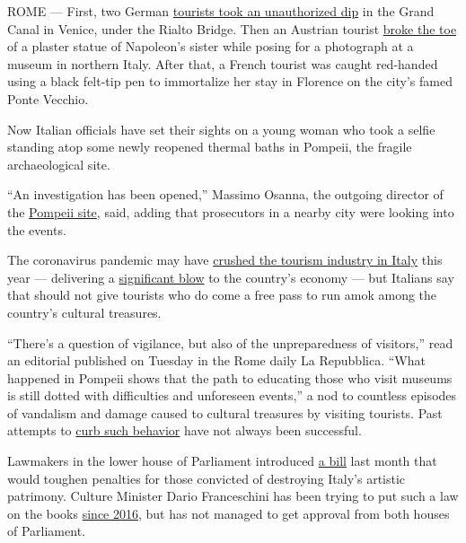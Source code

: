 ROME --- First, two German
\href{https://www.youtube.com/watch?v=dOfUmHXjXqg}{tourists took an
unauthorized dip} in the Grand Canal in Venice, under the Rialto Bridge.
Then an Austrian tourist
\href{https://www.nytimes3xbfgragh.onion/2020/08/06/arts/tourist-breaks-sculptures-toes.html?searchResultPosition=1}{broke
the toe} of a plaster statue of Napoleon's sister while posing for a
photograph at a museum in northern Italy. After that, a French tourist
was caught red-handed using a black felt-tip pen to immortalize her stay
in Florence on the city's famed Ponte Vecchio.

Now Italian officials have set their sights on a young woman who took a
selfie standing atop some newly reopened thermal baths in Pompeii, the
fragile archaeological site.

``An investigation has been opened,'' Massimo Osanna, the outgoing
director of the \href{http://pompeiisites.org/en/}{Pompeii site}, said,
adding that prosecutors in a nearby city were looking into the events.

The coronavirus pandemic may have
\href{https://www.confcommercio.it/-/niente-turisti-stranieri-crolla-lusso}{crushed
the tourism industry in Italy} this year --- delivering a
\href{https://ec.europa.eu/growth/tools-databases/vto/content/oecd-tourism-trends-and-policies-2018-italy}{significant
blow} to the country's economy --- but Italians say that should not give
tourists who do come a free pass to run amok among the country's
cultural treasures.

``There's a question of vigilance, but also of the unpreparedness of
visitors,'' read an editorial published on Tuesday in the Rome daily La
Repubblica. ``What happened in Pompeii shows that the path to educating
those who visit museums is still dotted with difficulties and unforeseen
events,'' a nod to countless episodes of vandalism and damage caused to
cultural treasures by visiting tourists. Past attempts to
\href{http://nytimes3xbfgragh.onion/2019/08/07/world/europe/rome-spanish-steps-sit.html}{curb
such behavior} have not always been successful.

Lawmakers in the lower house of Parliament introduced
\href{http://documenti.camera.it/leg18/pdl/pdf/leg.18.pdl.camera.2571.18PDL0107250.pdf}{a
bill} last month that would toughen penalties for those convicted of
destroying Italy's artistic patrimony. Culture Minister Dario
Franceschini has been trying to put such a law on the books
\href{https://storico.beniculturali.it/mibac/export/MiBAC/sito-MiBAC/Contenuti/MibacUnif/Comunicati/visualizza_asset.html_1253809747.html}{since
2016}, but has not managed to get approval from both houses of
Parliament.

